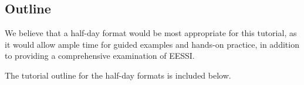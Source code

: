 \subsection*{Outline}

We believe that a half-day format would be most appropriate for this tutorial, as it would allow ample time for guided examples and hands-on practice, in addition to providing a comprehensive examination of EESSI.

The tutorial outline for the half-day formats is included below.

% 

